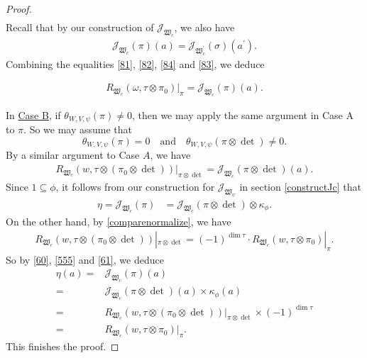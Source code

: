 \documentclass[article]{article}
\numberwithin{equation}{section}
\theoremstyle{definition}
\begin{document}
\begin{proof}
\begin{align}
	\end{align}
	Recall that by our construction of $\mathcal J_{\mathfrak W_{c}}$, we also have 
	\begin{align}\label{83}
	\mathcal J_{\mathfrak W_{c}}(\pi)(a)=\mathcal J_{\mathfrak W^\prime_{c}}(\sigma)(a^{\prime}).
	\end{align}
	Combining the equalities \ref{81}, \ref{82}, \ref{84} and \ref{83}, we deduce  
	\begin{comment}
	\begin{align*}
	R_{c^{\prime}}(\omega,\tau\otimes \pi_0)|\pi=\omega_{\tau}(1/c^{\prime})\cdot \chi_{V}(c^{\prime})^k\cdot \eta(\sigma)(a^{\prime})\\
	=\eta_{c^{\prime}}(\sigma)(a^{\prime})= \eta_{c^{\prime}}(\pi)(a)
	\end{align*}
	\end{comment}
	\begin{align*}
	R_{\mathfrak W_{c}}(\omega,\tau\otimes \pi_0)|_\pi= \mathcal J_{\mathfrak W_c}(\pi)(a). 
	\end{align*}
	
	In \underline{Case B}, if $\theta_{W,V,\psi}(\pi)\neq 0$, then we may apply the same argument in Case A to $\pi$. So we may assume that $$\theta_{W,V,\psi}(\pi)=0\quad \mbox{and}\quad \theta_{W,V,\psi}(\pi\otimes\det)\neq 0.$$ 
	By a similar argument to Case $A$, we have 
	\begin{align}\label{60}
	R_{\mathfrak W_{c}}(w,\tau\otimes (\pi_0\otimes\det))|_{\pi\otimes\det}= \mathcal J_{\mathfrak W_c}(\pi\otimes
	\det)(a).
	\end{align}
  Since $1\subseteq\phi$, it follows from our construction for $\mathcal J_{\mathfrak W_{\psi}}$ in section \ref{constructJc} that 
	\begin{equation}\label{555}
	\begin{aligned}
	\eta=\mathcal J_{\mathfrak W_{c}}(\pi)&= \mathcal J_{\mathfrak W_{c}}(\pi\otimes\det)\otimes\kappa_{\phi}.
	\end{aligned}
	\end{equation}
	On the other hand, by \ref{comparenormalize}, we have 
	\begin{align}\label{61}
	R_{\mathfrak W_{c}}(w,\tau\otimes (\pi_0\otimes\det))|_{\pi\otimes\det}=(-1)^{\dim\tau}\cdot R_{\mathfrak W_{c}}(w,\tau\otimes \pi_0)|_\pi .
	\end{align}
	So by \ref{60}, \ref{555} and \ref{61}, we deduce 
	\begin{align*}
   \eta(a)=&\mathcal J_{\mathfrak W_c}(\pi)(a)\\
   =&\mathcal J_{\mathfrak W_c}(\pi\otimes
   \det)(a)\times \kappa_{\phi}(a)\\ 
   =& R_{\mathfrak W_{c}}(w,\tau\otimes (\pi_0\otimes\det))|_{\pi\otimes\det}\times (-1)^{\dim \tau}\\
   =&R_{\mathfrak W_{c}}(w,\tau\otimes \pi_0)|_\pi. 
   \end{align*}	
   This finishes the proof.
\end{proof}
\end{document}
